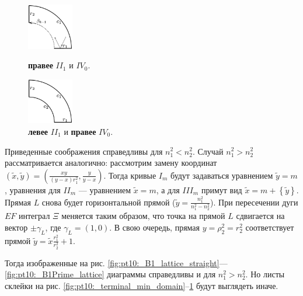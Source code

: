 \begin{statement}
\begin{figure}[!htb]
\centering
\includegraphics[width=2cm]{images/ch4/section3_circular/atoms/branching/B1Prime_max_domain.pdf}
    \caption{\textbf{правее} $II_1$ и $IV_0$.}
    \label{fig:pt10:_terminal_max_domain_B1Prime}
\endminipage\hfill
{}
\centering
\includegraphics[width=2cm]{images/ch4/section3_circular/atoms/branching/sect3_C1_domain_prime.pdf}
    \caption{\textbf{левее} $II_1$ и  \textbf{правее} $IV_0$.}
    \label{fig:pt10:_C1_domainPrime}
\endminipage\hfill
\end{figure}
\label{st:stat_leaf_shapes}
\end{statement}



\begin{remark}
Приведенные соображения справедливы для $n_1^2 < n_2^2$. Случай  $n_1^2 > n_2^2$ рассматривается аналогично: рассмотрим замену координат $(\widetilde{x}, \widetilde{y}) = \left( \frac{xy}{(y-x)r_1^2}, \frac{y}{y-x}\right)$. Тогда кривые $I_m$ будут задаваться уравнением $\widetilde{y} = m$, уравнения для $II_m$ --- уравнением $\widetilde{x} = m$, а для  $III_m$ примут вид $\widetilde{x} = m + \left\{\widetilde{y}\right\}$. Прямая $L$ снова будет горизонтальной прямой ($\widetilde{y} = \frac{n_1^2}{n_1^2-n_2^2}$). 
При пересечении дуги $EF$ интеграл $\Xi$ меняется таким образом, что точка на прямой $L$ сдвигается на вектор $\pm \gamma_L$, где $\gamma_L = (1,0)$. В свою очередь, прямая $y=\rho_2^2 = r_2^2$ соответствует прямой $\widetilde{y} = \widetilde{x} \frac{r_1^2}{r_2^2} + 1$. 

Тогда изображенные на  рис. \ref{fig:pt10:_B1_lattice_straight}---\ref{fig:pt10:_B1Prime_lattice} диаграммы справедливы и для $n_1^2 > n_2^2$. Но листы склейки на рис. 
 \ref{fig:pt10:_terminal_min_domain}--\ref{fig:pt10:_C1_domainPrime} будут выглядеть иначе.
\label{rem:diagram_reuse}
\end{remark}


